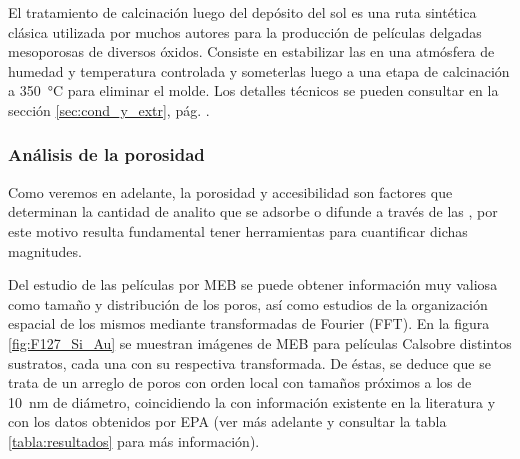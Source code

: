 	 		El tratamiento de calcinación luego del depósito del sol es una ruta sintética clásica utilizada por muchos autores para la producción de películas delgadas mesoporosas de diversos óxidos\cite{Soler-Illia2002a,Brinker1999,Soler-Illia2006,Grosso2004,Innocenzi2013,angelome2011}. Consiste en estabilizar las \pdm\space en una atmósfera de humedad y temperatura controlada y someterlas luego a una etapa de calcinación a \SI{350}{\celsius} para eliminar el molde. Los detalles técnicos se pueden consultar en la sección \ref{sec:cond_y_extr}, pág. \pageref{sec:cond_y_extr}.

	 	\subsubsection{Análisis de la porosidad}

		 Como veremos en adelante, la porosidad y accesibilidad son factores que determinan la cantidad de analito que se adsorbe o difunde a través de las \pdm, por este motivo resulta fundamental tener herramientas para cuantificar dichas magnitudes. 

		 Del estudio de las películas por MEB se puede obtener información muy valiosa como tamaño y distribución de los poros, así como estudios de la organización espacial de los mismos mediante transformadas de Fourier (FFT). En la figura \ref{fig:F127_Si_Au} se muestran imágenes de MEB para películas Cal\pdmF\space sobre distintos sustratos, cada una con su respectiva transformada. De éstas, se deduce que se trata de un arreglo de poros con orden local con tamaños próximos a los de \SI{10}{\nm} de diámetro, coincidiendo la con información existente en la literatura\cite{urade2005,angelome2011,lee2006} y con los datos obtenidos por EPA (ver más adelante y consultar la tabla \ref{tabla:resultados} para más información).  

